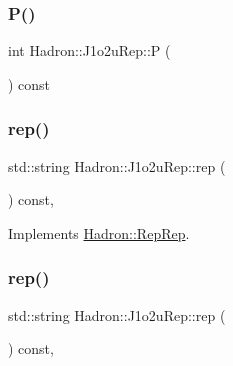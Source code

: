 \mbox{\label{structHadron_1_1J1o2uRep_a2babc8719f93a2e2b7fa74c30f3d1b67}} 
\subsubsection{\texorpdfstring{P()}{P()}\hspace{0.1cm}{\footnotesize\ttfamily [2/2]}}
{\footnotesize\ttfamily int Hadron\+::\+J1o2u\+Rep\+::P (\begin{DoxyParamCaption}{ }\end{DoxyParamCaption}) const\hspace{0.3cm}{\ttfamily [inline]}}

\mbox{\label{structHadron_1_1J1o2uRep_af553ca15778c740b311c7305ade44c66}} 
\subsubsection{\texorpdfstring{rep()}{rep()}\hspace{0.1cm}{\footnotesize\ttfamily [1/2]}}
{\footnotesize\ttfamily std\+::string Hadron\+::\+J1o2u\+Rep\+::rep (\begin{DoxyParamCaption}{ }\end{DoxyParamCaption}) const\hspace{0.3cm}{\ttfamily [inline]}, {\ttfamily [virtual]}}



Implements \mbox{\hyperlink{structHadron_1_1RepRep_ab3213025f6de249f7095892109575fde}{Hadron\+::\+Rep\+Rep}}.

\mbox{\label{structHadron_1_1J1o2uRep_af553ca15778c740b311c7305ade44c66}} 
\subsubsection{\texorpdfstring{rep()}{rep()}\hspace{0.1cm}{\footnotesize\ttfamily [2/2]}}
{\footnotesize\ttfamily std\+::string Hadron\+::\+J1o2u\+Rep\+::rep (\begin{DoxyParamCaption}{ }\end{DoxyParamCaption}) const\hspace{0.3cm}{\ttfamily [inline]}, {\ttfamily [virtual]}}




